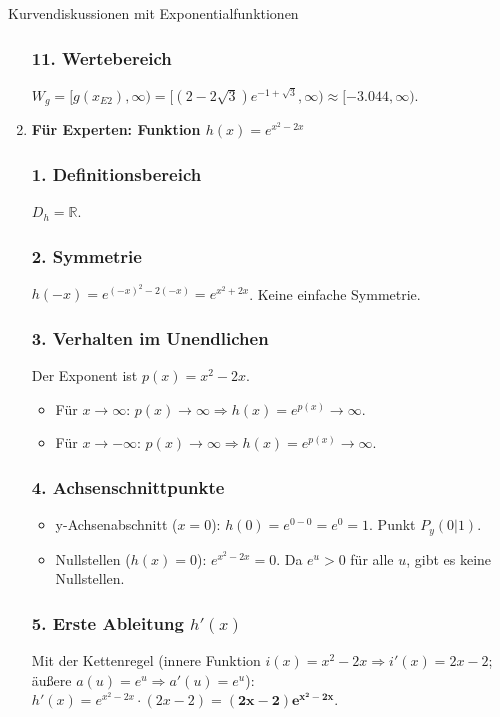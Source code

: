 \begin{loesungsumgebung}{Kurvendiskussionen mit Exponentialfunktionen}
\begin{enumerate}[label=(\alph*)]
    \subsubsection*{11. Wertebereich}
    $W_g = [g(x_{E2}), \infty) = [(2-2\sqrt{3})e^{-1+\sqrt{3}}, \infty) \approx [-3.044, \infty)$.

    \item \textbf{Für Experten: Funktion $h(x) = e^{x^2-2x}$}

    \subsubsection*{1. Definitionsbereich}
    $D_h = \mathbb{R}$.

    \subsubsection*{2. Symmetrie}
    $h(-x) = e^{(-x)^2-2(-x)} = e^{x^2+2x}$. Keine einfache Symmetrie.

    \subsubsection*{3. Verhalten im Unendlichen}
    Der Exponent ist $p(x)=x^2-2x$.
    \begin{itemize}
        \item Für $x \to \infty$: $p(x) \to \infty \Rightarrow h(x) = e^{p(x)} \to \infty$.
        \item Für $x \to -\infty$: $p(x) \to \infty \Rightarrow h(x) = e^{p(x)} \to \infty$.
    \end{itemize}

    \subsubsection*{4. Achsenschnittpunkte}
    \begin{itemize}
        \item y-Achsenabschnitt ($x=0$): $h(0) = e^{0-0} = e^0 = 1$. Punkt $P_y(0|1)$.
        \item Nullstellen ($h(x)=0$): $e^{x^2-2x}=0$. Da $e^u > 0$ für alle $u$, gibt es keine Nullstellen.
    \end{itemize}

    \subsubsection*{5. Erste Ableitung $h'(x)$}
    Mit der Kettenregel (innere Funktion $i(x)=x^2-2x \Rightarrow i'(x)=2x-2$; äußere $a(u)=e^u \Rightarrow a'(u)=e^u$):
    $h'(x) = e^{x^2-2x} \cdot (2x-2) = \mathbf{(2x-2)e^{x^2-2x}}$.


\end{enumerate}
\end{loesungsumgebung}
